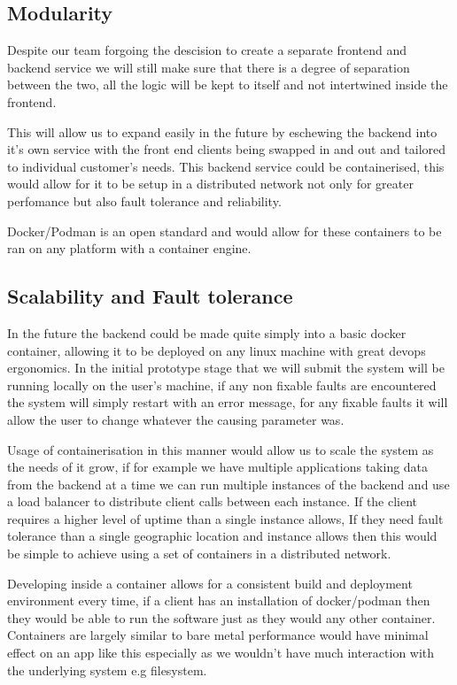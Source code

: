 \documentclass{article}
\begin{document}
\subsection{Modularity}
Despite our team forgoing the descision to create a separate frontend and backend 
service we will still make sure that there is a degree of separation between the 
two, all the logic will be kept to itself and not intertwined inside the frontend.

This will allow us to expand easily in the future by eschewing the backend into 
it's own service with the front end clients being swapped in and out and tailored 
to individual customer's needs. This backend service could be containerised, this 
would allow for it to be setup in a distributed network not only for greater 
perfomance but also fault tolerance and reliability.

Docker/Podman is an open standard and would allow for these containers to be ran 
on any platform with a container engine.

\subsection{Scalability and Fault tolerance}
In the future the backend could be made quite simply into a basic docker container, 
allowing it to be deployed on any linux machine with great devops ergonomics. In the 
initial prototype stage that we will submit the system will be running locally on the 
user's machine, if any non fixable faults are encountered the system will simply 
restart with an error message, for any fixable faults it will allow the user to change 
whatever the causing parameter was.

Usage of containerisation in this manner would allow us to scale the system as the 
needs of it grow, if for example we have multiple applications taking data from the 
backend at a time we can run multiple instances of the backend and use a load balancer 
to distribute client calls between each instance. If the client requires a higher level 
of uptime than a single instance allows, If they need fault tolerance than a single 
geographic location and instance allows then this would be simple to achieve using a 
set of containers in a distributed network.

Developing inside a container allows for a consistent build and deployment environment 
every time, if a client has an installation of docker/podman then they would be able to 
run the software just as they would any other container. Containers are largely similar 
to bare metal performance would have minimal effect on an app like this especially as 
we wouldn't have much interaction with the underlying system e.g filesystem.
\end{document}
